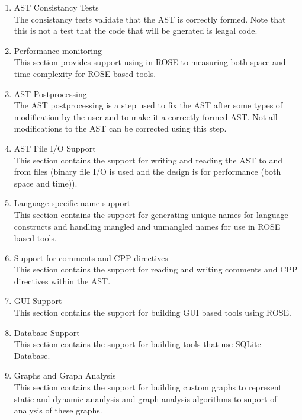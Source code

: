 \begin{enumerate}
\begin{enumerate}
      \item AST Consistancy Tests \\
         The consistancy tests validate that the AST is correctly formed. Note that this
         is not a test that the code that will be gnerated is leagal code.

      \item Performance monitoring \\
         This section provides support using in ROSE to measuring both space and 
         time complexity for ROSE based tools.

      \item AST Postprocessing \\
         The AST postprocessing is a step used to fix the AST after some types of 
         modification by the user and to make it a correctly formed AST. Not all
         modifications to the AST can be corrected using this step.

      \item AST File I/O Support \\
         This section contains the support for writing and reading the AST to and from
         files (binary file I/O is used and the design is for performance (both space and
         time)).

      \item Language specific name support \\
         This section contains the support for generating unique names for language
         constructs and handling mangled and unmangled names for use in ROSE based tools.

      \item Support for comments and CPP directives \\
         This section contains the support for reading and writing comments and CPP
         directives within the AST.

      \item GUI Support \\
         This section contains the support for building GUI based tools using ROSE.

      \item Database Support \\
         This section contains the support for building tools that use SQLite Database.

      \item Graphs and Graph Analysis \\
         This section contains the support for building custom graphs to represent static
         and dynamic ananlysis and graph analysis algorithms to suport of analysis of
         these graphs.


\end{enumerate}
\end{enumerate}
